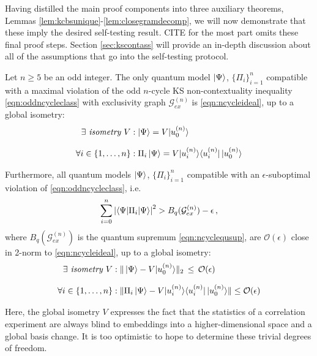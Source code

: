 Having distilled the main proof components into three auxiliary theorems, Lemmas \ref{lem:kcbsunique}-\ref{lem:closegramdecomp}, we will now demonstrate that these imply the desired self-testing result. CITE for the most part omits these final proof steps. Section \ref{sec:kscontass} will provide an in-depth discussion about all of the assumptions that go into the self-testing protocol.

\begin{theorem}
\label{thm:contselftesting}\hfill\break
Let $n\geq5$ be an odd integer. The only quantum model $\ket{\Psi}$, $\{\Pi_i\}_{i=1}^n$ compatible with a maximal violation of the odd $n$-cycle KS non-contextuality inequality \ref{eqn:oddncycleclass} with exclusivity graph $\mathcal{G}_{ex}^{(n)}$ is \ref{eqn:ncycleideal}, up to a global isometry:
\begin{align*}
    \exists \emph{ isometry } V & : \ket{\Psi} = V \vert u_0^{(n)}\rangle \\[0.7em]
    \forall i\in\{1,\dots,n\} & : \Pi_i \ket{\Psi} = V \vert u_i^{(n)} \rangle \langle u_i^{(n)} \vert \thinspace \vert u_0^{(n)} \rangle
\end{align*}

Furthermore, all quantum models $\ket{\Psi}$, $\{\Pi_i\}_{i=1}^n$ compatible with an $\epsilon$-suboptimal violation of \ref{eqn:oddncycleclass}, i.e.\
\begin{equation*}
    \sum_{i=0}^n \abs{\langle \Psi \vert \Pi_i \vert \Psi \rangle}^2> B_q(\mathcal{G}_{ex}^{(n)})-\epsilon\thinspace ,
\end{equation*}where $B_q(\mathcal{G}_{ex}^{(n)})$ is the quantum supremum \ref{eqn:ncyclequsup}, are $\mathcal{O}(\epsilon)$ close in 2-norm to \ref{eqn:ncycleideal}, up to a global isometry:
\begin{align*}
    \exists \emph{ isometry } V & : \| \ket{\Psi} - V \vert u_0^{(n)}\rangle \|_2 \thinspace\leq\thinspace \mathcal{O}(\epsilon)\\[0.7em]
    \forall i\in\{1,\dots,n\} & : \| \Pi_i \ket{\Psi} - V \vert u_i^{(n)} \rangle \langle u_i^{(n)} \vert \thinspace \vert u_0^{(n)} \rangle \| \leq \mathcal{O}(\epsilon)
\end{align*}
\end{theorem}

Here, the global isometry $V$ expresses the fact that the statistics of a correlation experiment are always blind to embeddings into a higher-dimensional space and a global basis change. It is too optimistic to hope to determine these trivial degrees of freedom. 


